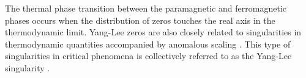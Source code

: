 \documentclass[aps,prl,twocolumn,superscriptaddress]{revtex4-1}
\begin{document}
\begin{bibunit}[apsrev4-2]
The thermal phase transition between the paramagnetic and ferromagnetic phases occurs when the distribution of zeros %
touches the real axis in the thermodynamic limit. Yang-Lee zeros are also closely related to singularities in thermodynamic quantities accompanied by anomalous scaling \cite{Fisher:1978vn,Kurtze:1979wb,10.1143/PTP.69.14,Cardy:1985ub,Cardy:1989uo,Zamolodchikov:1991tl}.
This type of singularities in critical phenomena is collectively referred to as the Yang-Lee singularity \cite{BENA2005}.
\begin{comment}
which, together with Yang-Lee zeros, has also been applied to quantum phase transitions \cite{Gehlen_1991,Sumaryada:2007uu,PhysRevB.53.7704,Matsumoto2020,PhysRevResearch.3.033206,PhysRevB.106.054402,PhysRevE.96.032116,PhysRevX.11.041018,PhysRevE.96.032116}. Therefore, Yang-Lee zeros can be applied to characterize the analytic property of thermodynamic quantities and origin of singularities at phase transitions of both classical and quantum many-body systems.

Despite its growing importance on understanding phase transition, it is still highly nontrivial to understand the origin of non-analycity in superconducting phase transition in terms of Yang-Lee zeros. We unveil that Yang-Lee zeros are the key to investigate the mechanism behind the essential singularity and non-perturbative property of Bardeen-Cooper-Schrieffer (BCS) model of superconductivity \cite{Bardeen:1957tx}. In addition, generally it is very difficult to determine the distribution of Yang-Lee zeros for a given model of interests. Here we discover semicircle theorem that Yang-Lee zeros are distributed on a semicricle on the complex plane of interaction strength in marginal fermionic many-body system. The BCS model is one of the examples.
\end{comment}



\end{bibunit}
\end{document}
